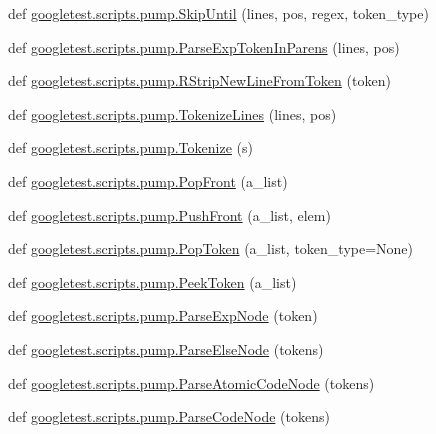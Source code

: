 \begin{DoxyCompactItemize}
def \mbox{\hyperlink{namespacegoogletest_1_1scripts_1_1pump_aee7df3cd9c1ae32452f296556fea978c}{googletest.\+scripts.\+pump.\+Skip\+Until}} (lines, pos, regex, token\+\_\+type)
\item 
def \mbox{\hyperlink{namespacegoogletest_1_1scripts_1_1pump_ab11d642074e8a73e294eba2bd782f4d3}{googletest.\+scripts.\+pump.\+Parse\+Exp\+Token\+In\+Parens}} (lines, pos)
\item 
def \mbox{\hyperlink{namespacegoogletest_1_1scripts_1_1pump_ab9cf1749432a8bfc7d3e6db75f079a2c}{googletest.\+scripts.\+pump.\+R\+Strip\+New\+Line\+From\+Token}} (token)
\item 
def \mbox{\hyperlink{namespacegoogletest_1_1scripts_1_1pump_acbd154dda1c9a3f0fda16dfe31a099de}{googletest.\+scripts.\+pump.\+Tokenize\+Lines}} (lines, pos)
\item 
def \mbox{\hyperlink{namespacegoogletest_1_1scripts_1_1pump_a53a997afde45baf7a888d5f4db9a448e}{googletest.\+scripts.\+pump.\+Tokenize}} (s)
\item 
def \mbox{\hyperlink{namespacegoogletest_1_1scripts_1_1pump_a132afc161c9b813baeb218a3a76c78d7}{googletest.\+scripts.\+pump.\+Pop\+Front}} (a\+\_\+list)
\item 
def \mbox{\hyperlink{namespacegoogletest_1_1scripts_1_1pump_affc8b8f56f6f4ed24f70b9af7a1d8268}{googletest.\+scripts.\+pump.\+Push\+Front}} (a\+\_\+list, elem)
\item 
def \mbox{\hyperlink{namespacegoogletest_1_1scripts_1_1pump_a1c500eec301f61d9374deb360a38663c}{googletest.\+scripts.\+pump.\+Pop\+Token}} (a\+\_\+list, token\+\_\+type=None)
\item 
def \mbox{\hyperlink{namespacegoogletest_1_1scripts_1_1pump_a237f7371eeeeaee15ee3260f48c52a53}{googletest.\+scripts.\+pump.\+Peek\+Token}} (a\+\_\+list)
\item 
def \mbox{\hyperlink{namespacegoogletest_1_1scripts_1_1pump_a0e7917de9cb576924bd5987d70e1c9ee}{googletest.\+scripts.\+pump.\+Parse\+Exp\+Node}} (token)
\item 
def \mbox{\hyperlink{namespacegoogletest_1_1scripts_1_1pump_aac33e9fc39fb94b9ddefed53767d00fc}{googletest.\+scripts.\+pump.\+Parse\+Else\+Node}} (tokens)
\item 
def \mbox{\hyperlink{namespacegoogletest_1_1scripts_1_1pump_a68411d8ccc9ef6665fa735966e1d5c98}{googletest.\+scripts.\+pump.\+Parse\+Atomic\+Code\+Node}} (tokens)
\item 
def \mbox{\hyperlink{namespacegoogletest_1_1scripts_1_1pump_ac507a68162dbbb79b7ca23e5aad21fca}{googletest.\+scripts.\+pump.\+Parse\+Code\+Node}} (tokens)

\end{DoxyCompactItemize}
